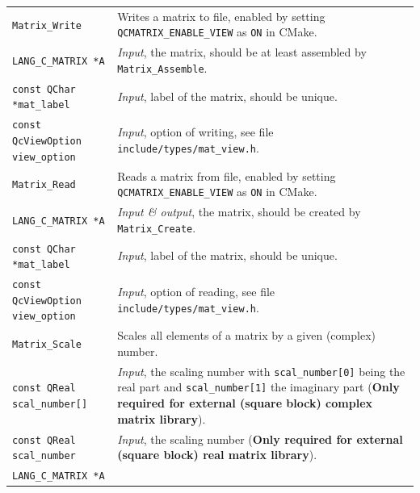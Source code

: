 \documentclass[a4paper,11pt,twoside,openright]{book}
\begin{document}
\begin{center}
\begin{longtable}{l|p{}}
    \hline
%
    \verb|Matrix_Write|\index{\texttt{Matrix\_Write}} %
      & Writes a matrix to file, enabled by setting \verb|QCMATRIX_ENABLE_VIEW| as
        \verb|ON| in CMake.\\
    \hspace*{2ex}\verb|LANG_C_MATRIX *A| %
      & \textsl{Input}, the matrix, should be at least assembled by \verb|Matrix_Assemble|.\\
    \hspace*{2ex}\verb|const QChar *mat_label| %
      & \textsl{Input}, label of the matrix, should be unique.\\
    \hspace*{2ex}\verb|const QcViewOption view_option| %
      & \textsl{Input}, option of writing, see file
        \verb|include/types/mat_view.h|.\\
    \hline
%
    \verb|Matrix_Read|\index{\texttt{Matrix\_Read}} %
      & Reads a matrix from file, enabled by setting \verb|QCMATRIX_ENABLE_VIEW| as
        \verb|ON| in CMake.\\
    \hspace*{2ex}\verb|LANG_C_MATRIX *A| %
      & \textsl{Input \& output}, the matrix, should be created by \verb|Matrix_Create|.\\
    \hspace*{2ex}\verb|const QChar *mat_label| %
      & \textsl{Input}, label of the matrix, should be unique.\\
    \hspace*{2ex}\verb|const QcViewOption view_option| %
      & \textsl{Input}, option of reading, see file
        \verb|include/types/mat_view.h|.\\
    \hline
%
    \verb|Matrix_Scale|\index{\texttt{Matrix\_Scale}} %
      & Scales all elements of a matrix by a given (complex) number.\\
    \hspace*{2ex}\verb|const QReal scal_number[]| %
      & \textsl{Input}, the scaling number with \verb|scal_number[0]| being the
        real part and \verb|scal_number[1]| the imaginary part %
        (\textbf{Only required for external (square block) complex matrix library}).\\
    \hspace*{2ex}\verb|const QReal scal_number| %
      & \textsl{Input}, the scaling number %
        (\textbf{Only required for external (square block) real matrix library}).\\
    \hspace*{2ex}\verb|LANG_C_MATRIX *A| %

\end{longtable}
\end{center}
\end{document}

